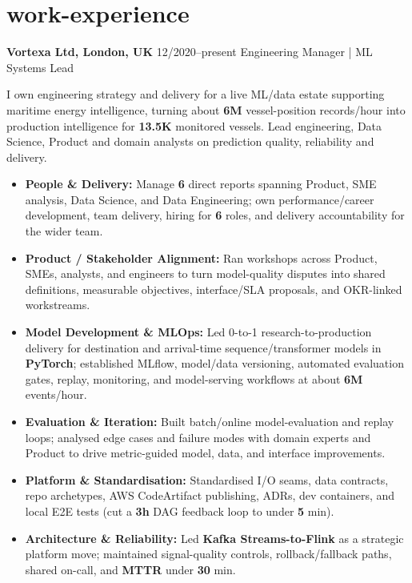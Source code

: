 \documentclass[]{../../../../friggeri-cv}
\renewcommand{\entry}[4]{%
  \parbox[t]{\dimexpr\textwidth-\entryleftinset\relax}{%
    \textbf{#2}%
    {\footnotesize\addfontfeature{Color=lightgray}\hspace{0.6em}#1}%
    \hfill%
    {\small\color{textcolor} #3}\\%
    #4\vspace{\parsep}%
  }\\}
\begin{document}
\section{work-experience}
\begin{entrylist}
    \entry
    {12/2020--present}
    {Vortexa Ltd, London, UK}
    {Engineering Manager | ML Systems Lead}
    {
        {\normalsize
        \setlength{\parindent}{0pt}
        \setlength{\leftskip}{0pt}
        I own engineering strategy and delivery for a live ML/data estate supporting maritime energy intelligence, turning about \textbf{6M} vessel-position records/hour into production intelligence for \textbf{13.5K} monitored vessels. Lead engineering, Data Science, Product and domain analysts on prediction quality, reliability and delivery.

        }
        \begin{itemize}[leftmargin=1.1em]
            \item \normalsize\textbf{People \& Delivery:} Manage \textbf{6} direct reports spanning Product, SME analysis, Data Science, and Data Engineering; own performance/career development, team delivery, hiring for \textbf{6} roles, and delivery accountability for the wider team.
            \item \normalsize\textbf{Product / Stakeholder Alignment:} Ran workshops across Product, SMEs, analysts, and engineers to turn model-quality disputes into shared definitions, measurable objectives, interface/SLA proposals, and OKR-linked workstreams.
            \item \normalsize\textbf{Model Development \& MLOps:} Led 0-to-1 research-to-production delivery for destination and arrival-time sequence/transformer models in \textbf{PyTorch}; established MLflow, model/data versioning, automated evaluation gates, replay, monitoring, and model-serving workflows at about \textbf{6M} events/hour.
            \item \normalsize\textbf{Evaluation \& Iteration:} Built batch/online model-evaluation and replay loops; analysed edge cases and failure modes with domain experts and Product to drive metric-guided model, data, and interface improvements.
            \item \normalsize\textbf{Platform \& Standardisation:} Standardised I/O seams, data contracts, repo archetypes, AWS CodeArtifact publishing, ADRs, dev containers, and local E2E tests (cut a \textbf{3h} DAG feedback loop to under \textbf{5} min).
            \item \normalsize\textbf{Architecture \& Reliability:} Led \textbf{Kafka Streams-to-Flink} as a strategic platform move; maintained signal-quality controls, rollback/fallback paths, shared on-call, and \textbf{MTTR} under \textbf{30} min.

\end{itemize}}
\end{entrylist}
\end{document}

